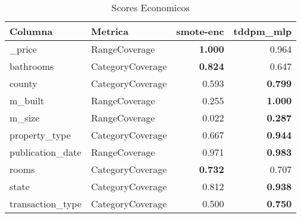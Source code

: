 \begin{table}[H]
\centering
\caption{Scores Economicos}
\label{table-coverage-economicos-a-1}
\begin{tabular}{|l|l|r|r|}
\hline
\rowcolor[gray]{0.8}
Columna & Metrica & smote-enc & tddpm\_mlp \\
\hline \_price & RangeCoverage & \bfseries 1.000 & 0.964 \\
\hline bathrooms & CategoryCoverage & \bfseries 0.824 & 0.647 \\
\hline county & CategoryCoverage & 0.593 & \bfseries 0.799 \\
\hline m\_built & RangeCoverage & 0.255 & \bfseries 1.000 \\
\hline m\_size & RangeCoverage & 0.022 & \bfseries 0.287 \\
\hline property\_type & CategoryCoverage & 0.667 & \bfseries 0.944 \\
\hline publication\_date & RangeCoverage & 0.971 & \bfseries 0.983 \\
\hline rooms & CategoryCoverage & \bfseries 0.732 & 0.707 \\
\hline state & CategoryCoverage & 0.812 & \bfseries 0.938 \\
\hline transaction\_type & CategoryCoverage & 0.500 & \bfseries 0.750 \\
\hline
\end{tabular}
\end{table}
